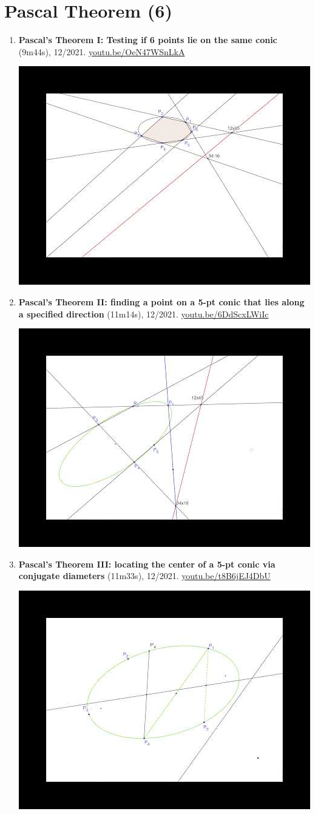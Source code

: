 \documentclass[12pt]{article}
\begin{document}
\section{Pascal Theorem (6)}

\begin{enumerate}[resume]
\item \textbf{Pascal's Theorem I: Testing if 6 points lie on the same conic} (9m44s), 12/2021. \href{https://youtu.be/OeN47WSnLkA}{\url{youtu.be/OeN47WSnLkA}}
\begin{center}\includegraphics[width=.5\textwidth]{pics/OeN47WSnLkA.jpg}\end{center}
% 
\item \textbf{Pascal's Theorem II: finding a point on a 5-pt conic that lies along a specified direction} (11m14s), 12/2021. \href{https://youtu.be/6DdScxLWiIc}{\url{youtu.be/6DdScxLWiIc}}
\begin{center}\includegraphics[width=.5\textwidth]{pics/6DdScxLWiIc.jpg}\end{center}
% 
\item \textbf{Pascal's Theorem III: locating the center of a 5-pt conic via conjugate diameters} (11m33s), 12/2021. \href{https://youtu.be/t8B6jEJ4DbU}{\url{youtu.be/t8B6jEJ4DbU}}
\begin{center}\includegraphics[width=.5\textwidth]{pics/t8B6jEJ4DbU.jpg}\end{center}

\end{enumerate}
\end{document}
